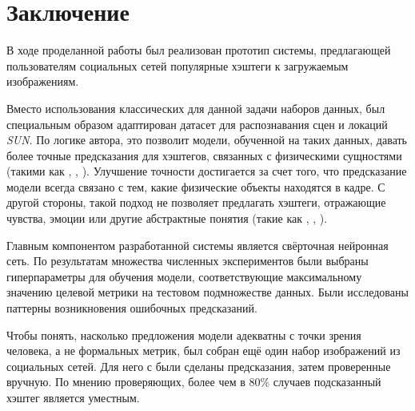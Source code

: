 \section*{Заключение}


\indent
\indent
\indent
В ходе проделанной работы был реализован прототип системы,
предлагающей пользователям социальных сетей популярные 
хэштеги к загружаемым изображениям.


\bigskip
\indent
\indent
Вместо использования классических для данной задачи наборов данных,
был специальным образом адаптирован 
датасет для распознавания сцен и локаций \textit{SUN}.
По логике автора, это позволит модели, обученной на таких данных,
давать более точные предсказания для хэштегов, связанных
с  физическими сущностями (такими как , , ).
Улучшение точности достигается за счет того, что предсказание модели всегда связано
с тем, какие физические объекты находятся в кадре. С другой стороны,
такой подход не позволяет предлагать хэштеги, отражающие чувства, эмоции
или другие абстрактные понятия (такие как , , ).


\bigskip
\indent
\indent
Главным компонентом разработанной системы является свёрточная 
нейронная сеть. По результатам множества численных экспериментов
были выбраны гиперпараметры для обучения модели, 
соответствующие максимальному 
значению целевой метрики на тестовом подмножестве данных.
Были исследованы паттерны возникновения ошибочных предсказаний.


\bigskip
\indent
\indent
Чтобы понять, насколько предложения модели адекватны с точки зрения 
человека, а не формальных метрик, был собран ещё один набор изображений
из социальных сетей. Для него с были сделаны 
предсказания, затем проверенные вручную. 
По мнению проверяющих, более чем в 80\% случаев 
подсказанный хэштег является уместным.
